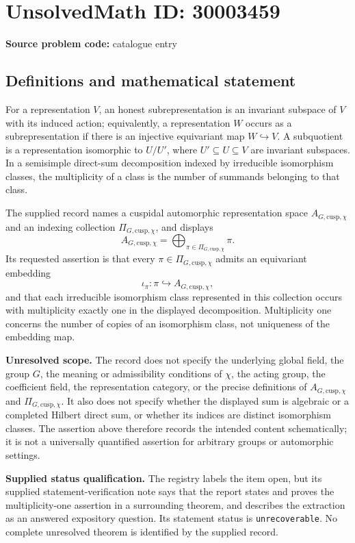 \documentclass[11pt]{article}
\begin{document}
\section*{UnsolvedMath ID: 30003459}
\textbf{Source problem code:} catalogue entry
\subsection{Definitions and mathematical statement}
For a representation \(V\), an honest subrepresentation is an invariant subspace of \(V\) with its induced action; equivalently, a representation \(W\) occurs as a subrepresentation if there is an injective equivariant map \(W\hookrightarrow V\). A subquotient is a representation isomorphic to \(U/U'\), where \(U'\subseteq U\subseteq V\) are invariant subspaces. In a semisimple direct-sum decomposition indexed by irreducible isomorphism classes, the multiplicity of a class is the number of summands belonging to that class.

The supplied record names a cuspidal automorphic representation space \(A_{G,\mathrm{cusp},\chi}\) and an indexing collection \(\Pi_{G,\mathrm{cusp},\chi}\), and displays
\[
A_{G,\mathrm{cusp},\chi}
=\bigoplus_{\pi\in\Pi_{G,\mathrm{cusp},\chi}}\pi.
\]
Its requested assertion is that every \(\pi\in\Pi_{G,\mathrm{cusp},\chi}\) admits an equivariant embedding
\[
\iota_\pi:\pi\hookrightarrow A_{G,\mathrm{cusp},\chi},
\]
and that each irreducible isomorphism class represented in this collection occurs with multiplicity exactly one in the displayed decomposition. Multiplicity one concerns the number of copies of an isomorphism class, not uniqueness of the embedding map.

\textbf{Unresolved scope.} The record does not specify the underlying global field, the group \(G\), the meaning or admissibility conditions of \(\chi\), the acting group, the coefficient field, the representation category, or the precise definitions of \(A_{G,\mathrm{cusp},\chi}\) and \(\Pi_{G,\mathrm{cusp},\chi}\). It also does not specify whether the displayed sum is algebraic or a completed Hilbert direct sum, or whether its indices are distinct isomorphism classes. The assertion above therefore records the intended content schematically; it is not a universally quantified assertion for arbitrary groups or automorphic settings.

\textbf{Supplied status qualification.} The registry labels the item open, but its supplied statement-verification note says that the report states and proves the multiplicity-one assertion in a surrounding theorem, and describes the extraction as an answered expository question. Its statement status is \texttt{unrecoverable}. No complete unresolved theorem is identified by the supplied record.
\end{document}
